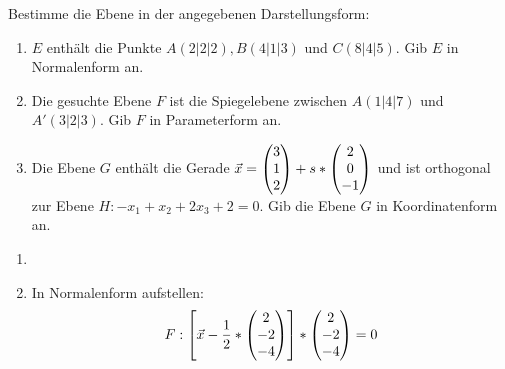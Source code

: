 






Bestimme die Ebene in der angegebenen Darstellungsform:
\begin{enumerate}
	\item $E$ enthält die Punkte $A(2|2|2), B(4|1|3)$ und $C(8|4|5)$. Gib $E$ in Normalenform an. %
	\item Die gesuchte Ebene $F$ ist die Spiegelebene zwischen $A(1|4|7)$ und $A'(3|2|3)$. Gib $F$ in Parameterform an. %
	\item Die Ebene $G$ enthält die Gerade $\vec x = \begin{pmatrix} 3\\1\\2 \end{pmatrix}+s*\begin{pmatrix} 2\\0\\-1 \end{pmatrix}$ und ist orthogonal zur Ebene $H:-x_1+x_2+2x_3+2=0$. Gib die Ebene $G$ in Koordinatenform an. %
\end{enumerate}
\begin{lsg}{}
	\begin{enumerate}
		\item
		\item In Normalenform aufstellen:
		\begin{equation*}
			F: \left[\vec x - \frac 12 *\begin{pmatrix} 2\\-2\\-4 \end{pmatrix}\right]*\begin{pmatrix} 2\\-2\\-4 \end{pmatrix}=0
		\end{equation*}
	\end{enumerate}
\end{lsg}





